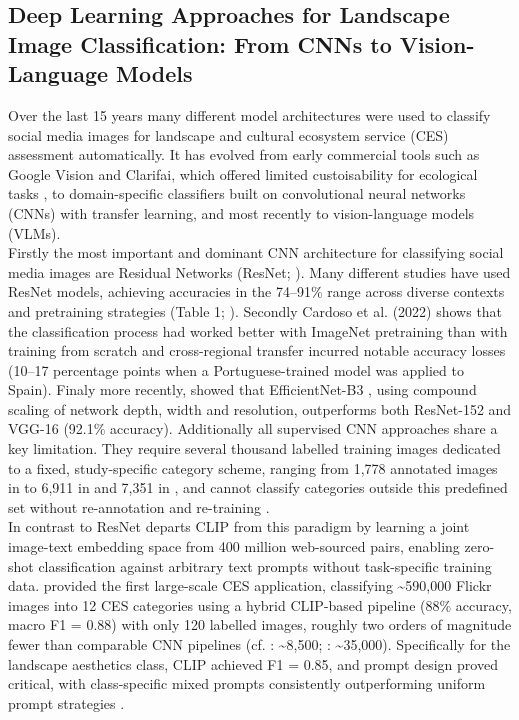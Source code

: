 \documentclass[hidelinks, 11pt]{article}
\begin{document}
\subsection{Deep Learning Approaches for Landscape Image Classification: From CNNs to Vision-Language Models}

Over the last 15 years many different model architectures were used to classify social media images for landscape and cultural ecosystem service (CES) assessment automatically. It has evolved from early commercial tools such as Google Vision and Clarifai, which offered limited custoisability for ecological tasks \citep{lingua_valuing_2022,winder_open-source_2022}, to domain-specific classifiers built on convolutional neural networks (CNNs) with transfer learning, and most recently to vision-language models (VLMs).
\\
Firstly the most important and dominant CNN architecture for classifying social media images are Residual Networks (ResNet; \citealt{he_deep_2016}). Many different studies have used ResNet models, achieving accuracies in the 74–91\% range across diverse contexts and pretraining strategies (Table 1; \citealt{cardoso_classifying_2022,lingua_valuing_2022,comalada_modelling_2025,xu_revealing_2025,you_mapping_2026}). Secondly Cardoso et al. (2022) shows that the classification process had worked better with ImageNet pretraining than with training from scratch and cross-regional transfer incurred notable accuracy losses (10--17 percentage points when a Portuguese-trained model was applied to Spain). Finaly more recently, \citet{chen_using_2025} showed that EfficientNet-B3 \citep{tan_efficientnet_2019}, using compound scaling of network depth, width and resolution, outperforms both ResNet-152 and VGG-16 (92.1\% accuracy). Additionally all supervised CNN approaches share a key limitation. They require several thousand labelled training images dedicated to a fixed, study-specific category scheme, ranging from 1,778 annotated images in \citet{cardoso_classifying_2022} to 6,911 in \citet{comalada_modelling_2025} and 7,351 in \citet{you_mapping_2026}, and cannot classify categories outside this predefined set without re-annotation and re-training \citep{radford_learning_2021}.
\\
In contrast to ResNet departs CLIP \citep{radford_learning_2021} from this paradigm by learning a joint image-text embedding space from 400 million web-sourced pairs, enabling zero-shot classification against arbitrary text prompts without task-specific training data. \citet{liao_mapping_2025} provided the first large-scale CES application, classifying \textasciitilde590,000 Flickr images into 12 CES categories using a hybrid CLIP-based pipeline (88\% accuracy, macro F1 = 0.88) with only 120 labelled images, roughly two orders of magnitude fewer than comparable CNN pipelines (cf. \citealt{cardoso_classifying_2022}: \textasciitilde8,500; \citealt{lingua_valuing_2022}: \textasciitilde35,000). Specifically for the landscape aesthetics class, CLIP achieved F1 = 0.85, and prompt design proved critical, with class-specific mixed prompts consistently outperforming uniform prompt strategies \citep{liao_mapping_2025}.
\end{document}
